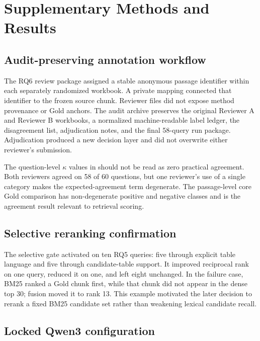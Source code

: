 \section{Supplementary Methods and Results}
\label{sec:supplementary}

\subsection{Audit-preserving annotation workflow}

The RQ6 review package assigned a stable anonymous passage identifier within each separately randomized workbook. A private mapping connected that identifier to the frozen source chunk. Reviewer files did not expose method provenance or Gold anchors. The audit archive preserves the original Reviewer A and Reviewer B workbooks, a normalized machine-readable label ledger, the disagreement list, adjudication notes, and the final 58-query run package. Adjudication produced a new decision layer and did not overwrite either reviewer's submission.



The question-level $\kappa$ values in  should not be read as zero practical agreement. Both reviewers agreed on 58 of 60 questions, but one reviewer's use of a single category makes the expected-agreement term degenerate. The passage-level core Gold comparison has non-degenerate positive and negative classes and is the agreement result relevant to retrieval scoring.

\subsection{Selective reranking confirmation}



The selective gate activated on ten RQ5 queries: five through explicit table language and five through candidate-table support. It improved reciprocal rank on one query, reduced it on one, and left eight unchanged. In the failure case, BM25 ranked a Gold chunk first, while that chunk did not appear in the dense top 30; fusion moved it to rank 13. This example motivated the later decision to rerank a fixed BM25 candidate set rather than weakening lexical candidate recall.

\subsection{Locked Qwen3 configuration}

